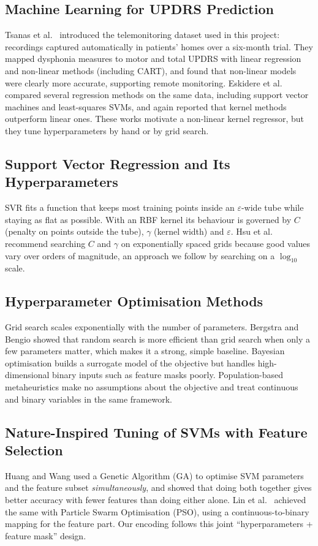 \documentclass[12pt,a4paper]{article}
\numberwithin{equation}{section}
\numberwithin{table}{section}
\numberwithin{figure}{section}
\begin{document}
\subsection{Machine Learning for UPDRS Prediction}
Tsanas et al.\ \cite{tsanas2010} introduced the telemonitoring dataset used in this project: recordings captured automatically in patients' homes over a six-month trial. They mapped dysphonia measures to motor and total UPDRS with linear regression and non-linear methods (including CART), and found that non-linear models were clearly more accurate, supporting remote monitoring. Eskidere et al.\ \cite{eskidere2012} compared several regression methods on the same data, including support vector machines and least-squares SVMs, and again reported that kernel methods outperform linear ones. These works motivate a non-linear kernel regressor, but they tune hyperparameters by hand or by grid search.

\subsection{Support Vector Regression and Its Hyperparameters}
SVR \cite{vapnik1995,smola2004} fits a function that keeps most training points inside an $\varepsilon$-wide tube while staying as flat as possible. With an RBF kernel its behaviour is governed by $C$ (penalty on points outside the tube), $\gamma$ (kernel width) and $\varepsilon$. Hsu et al.\ \cite{hsu2003} recommend searching $C$ and $\gamma$ on exponentially spaced grids because good values vary over orders of magnitude, an approach we follow by searching on a $\log_{10}$ scale.

\subsection{Hyperparameter Optimisation Methods}
Grid search scales exponentially with the number of parameters. Bergstra and Bengio \cite{bergstra2012} showed that random search is more efficient than grid search when only a few parameters matter, which makes it a strong, simple baseline. Bayesian optimisation \cite{snoek2012} builds a surrogate model of the objective but handles high-dimensional binary inputs such as feature masks poorly. Population-based metaheuristics make no assumptions about the objective and treat continuous and binary variables in the same framework.

\subsection{Nature-Inspired Tuning of SVMs with Feature Selection}
Huang and Wang \cite{huang2006} used a Genetic Algorithm (GA) to optimise SVM parameters and the feature subset \emph{simultaneously}, and showed that doing both together gives better accuracy with fewer features than doing either alone. Lin et al.\ \cite{lin2008} achieved the same with Particle Swarm Optimisation (PSO), using a continuous-to-binary mapping for the feature part. Our encoding follows this joint ``hyperparameters + feature mask'' design.
\end{document}
